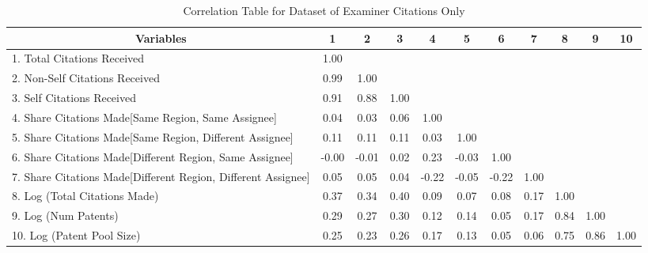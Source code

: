 \documentclass[12pt,letterpaper]{article}
\begin{document}
\begin{center}
\begin{table}[htbp]\centering \caption{Correlation Table for Dataset of Examiner Citations Only \label{e.corrtable}}
\scriptsize
\singlespacing
\begin{adjustbox}{angle=0}
\begin{tabular}{l  c  c  c  c  c  c  c  c  c  c }

\hline
\multicolumn{1}{c}{Variables} &1&2&3&4&5&6&7&8&9&10\\ \hline
1. Total Citations Received&1.00\\
2. Non-Self Citations Received&0.99&1.00\\
3. Self Citations Received&0.91&0.88&1.00\\
4. Share Citations Made[Same Region, Same Assignee]&0.04&0.03&0.06&1.00\\
5. Share Citations Made[Same Region, Different Assignee]&0.11&0.11&0.11&0.03&1.00\\
6. Share Citations Made[Different Region, Same Assignee]&-0.00&-0.01&0.02&0.23&-0.03&1.00\\
7. Share Citations Made[Different Region, Different Assignee]&0.05&0.05&0.04&-0.22&-0.05&-0.22&1.00\\
8. Log (Total Citations Made)&0.37&0.34&0.40&0.09&0.07&0.08&0.17&1.00\\
9. Log (Num Patents)&0.29&0.27&0.30&0.12&0.14&0.05&0.17&0.84&1.00\\
10. Log (Patent Pool Size)&0.25&0.23&0.26&0.17&0.13&0.05&0.06&0.75&0.86&1.00\\ \hline
\end{tabular}
\end{adjustbox}
\end{table}
\end{center}
\end{document}
